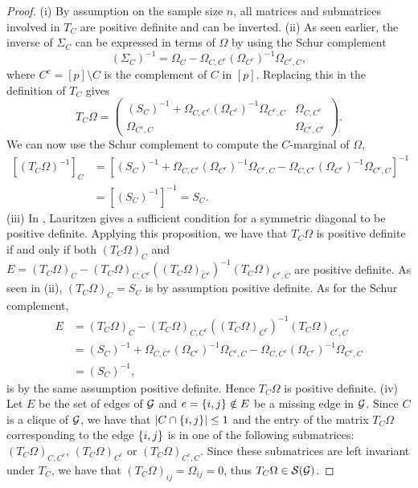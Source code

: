 \begin{proof}
    (i) By assumption on the sample size $n$, all matrices and submatrices involved in $T_C$ are positive definite and can be inverted.
    \newline
    (ii) As seen earlier, the inverse of $\Sigma_C$ can be expressed in terms of $\Omega$ by using the Schur complement
    \begin{equation*}
        (\Sigma_C)^{-1} = \Omega_C - \Omega_{C, C^c}(\Omega_{C^c})^{-1}\Omega_{C^c, C},
    \end{equation*}
    where $C^c = [p] \setminus C$ is the complement of $C$ in $[p]$. Replacing this in the definition of $T_C$ gives
    \begin{equation} \label{eq-tc-2}
        T_C \Omega = \begin{pmatrix}
            (S_C)^{-1} + \Omega_{C, C^c}(\Omega_{C^c})^{-1}\Omega_{C^c, C} & \Omega_{C, C^c}\\
            \Omega_{C^c, C} & \Omega_{C^c, C^c}
            \end{pmatrix}.
    \end{equation}
    We can now use the Schur complement to compute the $C$-marginal of $\Omega$,
    \begin{align*}
        \left[(T_C \Omega)^{-1}\right]_C 
        &= \left[ (S_C)^{-1} + \Omega_{C, C^c}(\Omega_{C^c})^{-1}\Omega_{C^c, C} - \Omega_{C, C^c}(\Omega_{C^c})^{-1}\Omega_{C^c, C} \right]^{-1}\\
        &= \left[ (S_C)^{-1}\right]^{-1} = S_C.
    \end{align*}
    (iii) In \cite[Proposition B.1]{lauritzen1996}, Lauritzen gives a sufficient condition for a symmetric diagonal to be positive definite. Applying this proposition, we have that $T_C \Omega$ is positive definite if and only if both $(T_C \Omega)_C$ and $E = (T_C \Omega)_C - (T_C \Omega)_{C, C^c}((T_C \Omega)_{C^c})^{-1}(T_C \Omega)_{C^c,C}$ are positive definite. As seen in (ii), $(T_C \Omega)_C = S_C$ is by assumption positive definite. As for the Schur complement,
    \begin{align*}
        E &= (T_C \Omega)_C - (T_C \Omega)_{C, C^c}((T_C \Omega)_{C^c})^{-1}(T_C \Omega)_{C^c,C}\\
        &= (S_C)^{-1} + \Omega_{C, C^c}(\Omega_{C^c})^{-1}\Omega_{C^c, C} - \Omega_{C, C^c}(\Omega_{C^c})^{-1}\Omega_{C^c,C}\\
        &= (S_C)^{-1},
    \end{align*}
    is by the same assumption positive definite. Hence $T_C \Omega$ is positive definite.
    \newline
    (iv) Let $E$ be the set of edges of ${\mathcal{G}}$ and $e = {\left\{i, j\right\}} \notin E$ be a missing edge in ${\mathcal{G}}$. Since $C$ is a clique of ${\mathcal{G}}$, we have that $|C \cap {\left\{i, j\right\}}| \leq 1$ and the entry of the matrix $T_C \Omega$ corresponding to the edge ${\left\{i, j\right\}}$ is in one of the following submatrices: $(T_C \Omega)_{C, C^c}$, $(T_C \Omega)_{C^c}$ or $(T_C \Omega)_{C^c,C}$. Since these submatrices are left invariant under $T_C$, we have that $(T_C \Omega)_{ij} = \Omega_{ij} = 0$, thus $T_C \Omega \in {\mathcal{S}}({\mathcal{G}})$.
\end{proof}

